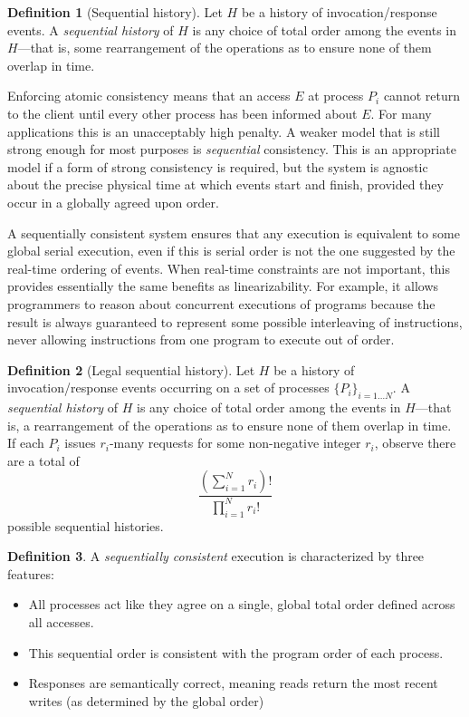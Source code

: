 \documentclass[]             %
{NASA}                       %
\theoremstyle{definition}
\newtheorem{definition}{Definition}[section]
\begin{document}
\begin{definition}[Sequential history]
  Let $H$ be a history of invocation/response events. A
  \emph{sequential history} of $H$ is any choice of total order among
  the events in $H$---that is, some rearrangement of the operations as
  to ensure none of them overlap in time.
\end{definition}

Enforcing atomic consistency means that an access \(E\) at process
\(P_i\) cannot return to the client until every other process has been
informed about \(E\). For many applications this is an unacceptably
high penalty. A weaker model that is still strong enough for most
purposes is \emph{sequential} consistency. This is an appropriate
model if a form of strong consistency is required, but the system is
agnostic about the precise physical time at which events start and
finish, provided they occur in a globally agreed upon order.

A sequentially consistent system ensures that any execution is
equivalent to some global serial execution, even if this is serial order
is not the one suggested by the real-time ordering of events. When
real-time constraints are not important, this provides essentially the
same benefits as linearizability. For example, it allows programmers to
reason about concurrent executions of programs because the result is
always guaranteed to represent some possible interleaving of
instructions, never allowing instructions from one program to execute
out of order.

\begin{definition}[Legal sequential history]
Let $H$ be a history of invocation/response events occurring on a set
of processes $\{P_i\}_{i = 1 \ldots N}$. A \emph{sequential history}
of $H$ is any choice of total order among the events in $H$---that is,
a rearrangement of the operations as to ensure none of them overlap in
time. If each $P_i$ issues
$r_i$-many requests for some non-negative integer $r_i$, observe there
are a total of
\[
\frac{\left(\sum_{i = 1}^N r_i\right)!}{\prod_{i = 1}^N r_i!}
\]
possible sequential histories.
\end{definition}

\begin{definition}
  \label{def:sequentiallyconsistent}
  A \emph{sequentially consistent} execution is
  characterized by three features:
  \begin{itemize}
  \item All processes act like they agree on a single, global total order
    defined across all accesses.
  \item This sequential order is consistent with the program order of each process.
  \item Responses are semantically correct, meaning reads return the most recent writes (as determined by the global order)
  \end{itemize}
\end{definition}
\end{document}
